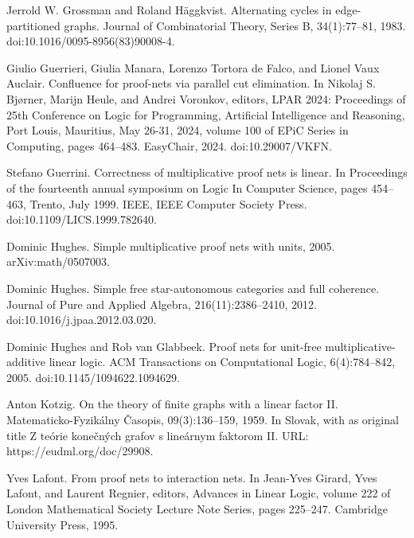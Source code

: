 \par\noindent  [19]  Jerrold W. Grossman and Roland Häggkvist.  Alternating cycles in edge-partitioned graphs.  Journal of Combinatorial Theory, Series B, 34(1):77–81, 1983.  doi:10.1016/0095-8956(83)90008-4.  
 
\par\noindent  [20]  Giulio Guerrieri, Giulia Manara, Lorenzo Tortora de Falco, and Lionel Vaux Auclair.  Confluence for proof-nets via parallel cut elimination.  In Nikolaj S. Bjørner, Marijn Heule, and Andrei Voronkov, editors, LPAR 2024: Proceedings of 25th Conference on Logic for Programming, Artificial Intelligence and Reasoning, Port Louis, Mauritius, May 26-31, 2024, volume 100 of EPiC Series in Computing, pages 464–483. EasyChair, 2024.  doi:10.29007/VKFN.  
 
\par\noindent  [21]  Stefano Guerrini.  Correctness of multiplicative proof nets is linear.  In Proceedings of the fourteenth annual symposium on Logic In Computer Science, pages 454–463, Trento, July 1999. IEEE, IEEE Computer Society Press.  doi:10.1109/LICS.1999.782640.  
 
\par\noindent  [22]  Dominic Hughes.  Simple multiplicative proof nets with units, 2005.  arXiv:math/0507003.  
 
\par\noindent  [23]  Dominic Hughes.  Simple free star-autonomous categories and full coherence.  Journal of Pure and Applied Algebra, 216(11):2386–2410, 2012.  doi:10.1016/j.jpaa.2012.03.020.  
 
\par\noindent  [24]  Dominic Hughes and Rob van Glabbeek.  Proof nets for unit-free multiplicative-additive linear logic.  ACM Transactions on Computational Logic, 6(4):784–842, 2005.  doi:10.1145/1094622.1094629.  
 
\par\noindent  [25]  Anton Kotzig.  On the theory of finite graphs with a linear factor II.  Matematicko-Fyzikálny Časopis, 09(3):136–159, 1959.  In Slovak, with as original title Z teórie konečných grafov s lineárnym faktorom II.  URL: https://eudml.org/doc/29908.  
 
\par\noindent  [26]  Yves Lafont.  From proof nets to interaction nets.  In Jean-Yves Girard, Yves Lafont, and Laurent Regnier, editors, Advances in Linear Logic, volume 222 of London Mathematical Society Lecture Note Series, pages 225–247. Cambridge University Press, 1995.  
 
